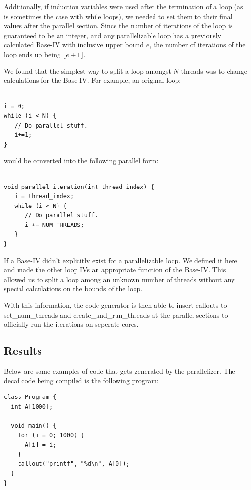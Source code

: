 \documentclass[11pt]{article}
\begin{document}
Additionally, if induction variables were used after the termination
of a loop (as is sometimes the case with while loops), we needed to
set them to their final values after the parallel section. Since the
number of iterations of the loop is guaranteed to be an integer, and
any parallelizable loop has a previously calculated Base-IV with
inclusive upper bound $e$, the number of iterations of the loop ends
up being $\lfloor e+1 \rfloor$. 

We found that the simplest way to split a loop amongst $N$ threads was
to change calculations for the Base-IV. For example, an
original loop: 
\begin{verbatim}

i = 0;
while (i < N) { 
   // Do parallel stuff.
   i+=1; 
}

\end{verbatim}
would be converted into the following parallel form: 
\begin{verbatim}

void parallel_iteration(int thread_index) {
   i = thread_index; 
   while (i < N) {
      // Do parallel stuff. 
      i += NUM_THREADS;
   }
}
\end{verbatim}

If a Base-IV didn't explicitly exist for a parallelizable loop. We
defined it here and made the other loop IVs an appropriate function of
the Base-IV. This allowed us to split a loop among an unknown number
of threads without any special calculations on the bounds of the
loop. 

With this information, the code generator is then able to insert
callouts to set\_num\_threads and create\_and\_run\_threads at the parallel
sections to officially run the iterations on seperate cores. 

\subsection{Results}

Below are some examples of code that gets generated by the
parallelizer. The decaf code being compiled is the following program: 

\begin{verbatim}
class Program {
  int A[1000];

  void main() {
    for (i = 0; 1000) {
      A[i] = i;
    }
    callout("printf", "%d\n", A[0]);
  }
}
\end{verbatim}
\end{document}
